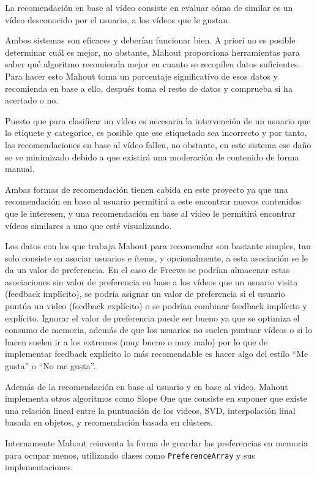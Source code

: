\documentclass[11pt]{book}
\begin{document}
La recomendación en base al vídeo consiste en evaluar cómo de similar es un vídeo desconocido por el usuario, a los vídeos que le gustan.

Ambos sistemas son eficaces y deberían funcionar bien. A priori no es posible determinar cuál es mejor, no obstante, Mahout proporciona herramientas para saber qué algoritmo recomienda mejor en cuanto se recopilen datos suficientes. Para hacer esto Mahout toma un porcentaje significativo de esos datos y recomienda en base a ello, después toma el resto de datos y comprueba si ha acertado o no.

Puesto que para clasificar un vídeo es necesaria la intervención de un usuario que lo etiquete y categorice, es posible que ese etiquetado sea incorrecto y por tanto, las recomendaciones en base al vídeo fallen, no obstante, en este sistema ese daño se ve minimizado debido a que existirá una moderación de contenido de forma manual.

Ambas formas de recomendación tienen cabida en este proyecto ya que una recomendación en base al usuario permitirá a este encontrar nuevos contenidos que le interesen, y una recomendación en base al vídeo le permitirá encontrar vídeos similares a uno que esté visualizando.

Los datos con los que trabaja Mahout para recomendar son bastante simples, tan solo consiste en asociar usuarios e ítems, y opcionalmente, a esta asociación se le da un valor de preferencia. En el caso de Freews se podrían almacenar estas asociaciones sin valor de preferencia en base a los vídeos que un usuario visita (feedback implícito), se podría asignar un valor de preferencia si el usuario puntúa un video (feedback explícito) o se podrían combinar feedback implícito y explícito. Ignorar el valor de preferencia puede ser bueno ya que se optimiza el consumo de memoria, además de que los usuarios no suelen puntuar vídeos o si lo hacen suelen ir a los extremos (muy bueno o muy malo) por lo que de implementar feedback explícito lo más recomendable es hacer algo del estilo ``Me gusta'' o ``No me gusta''.

Además de la recomendación en base al usuario y en base al video, Mahout implementa otros algoritmos como Slope One que consiste en suponer que existe una relación lineal entre la puntuación de los videos, SVD, interpolación linal basada en objetos, y recomendación basada en clústers.

Internamente Mahout reinventa la forma de guardar las preferencias en memoria para ocupar menos, utilizando clases como \texttt{PreferenceArray} y sus implementaciones.
\end{document}
